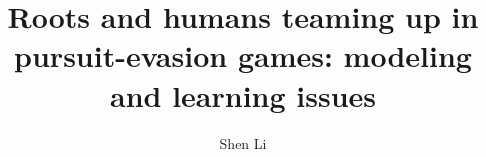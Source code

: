 \documentclass{article}
\begin{document}
%
\title{Roots and humans teaming up in pursuit-evasion games: modeling and learning issues}
\author{Shen Li}

\maketitle






\end{document}

